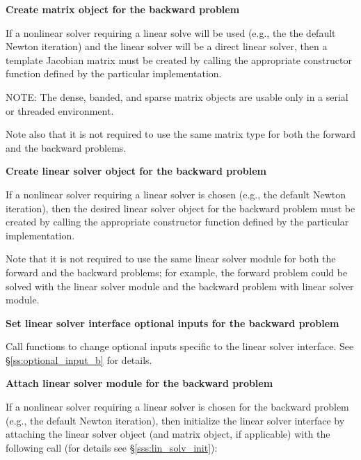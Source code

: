 \begin{Steps}
\item \label{i:matrixB}
  {\bf Create matrix object for the backward problem}

  If a nonlinear solver requiring a linear solve will be used (e.g., the
  the default Newton iteration) and the linear solver will be a direct linear
  solver, then a template Jacobian matrix must be created by calling the
  appropriate constructor function defined by the particular {\sunmatrix}
  implementation.

  NOTE: The dense, banded, and sparse matrix objects are usable only in a
  serial or threaded environment.

  Note also that it is not required to use the same matrix type for both the forward
  and the backward problems.

\item \label{i:lin_solverB}
  {\bf Create linear solver object for the backward problem}

  If a nonlinear solver requiring a linear solver is chosen (e.g., the default
  Newton iteration), then the desired linear solver object for the backward
  problem must be created by calling the appropriate constructor function
  defined by the particular {\sunlinsol} implementation.

  Note that it is not required to use the same linear solver module for both the forward
  and the backward problems; for example, the forward problem could be solved
  with the {\sunlinsoldense} linear solver module and the backward
  problem with {\sunlinsolspgmr} linear solver module.

\item
  {\bf Set linear solver interface optional inputs for the backward problem}

  Call  functions to change optional inputs specific to
  the linear solver interface. See \S\ref{ss:optional_input_b} for details.

\item\label{i:lin_solver_interfaceB}
  {\bf Attach linear solver module for the backward problem}

  If a nonlinear solver requiring a linear solver is chosen for the backward
  problem (e.g., the default Newton iteration), then initialize the
  {\idals} linear solver interface by attaching the linear solver
  object (and matrix object, if applicable) with the following call (for details see
  \S\ref{sss:lin_solv_init}):



\end{Steps}

